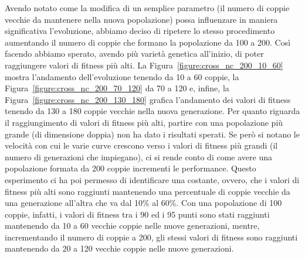 Avendo notato come la modifica di un semplice parametro (il numero di coppie
vecchie da mantenere nella nuova popolazione) possa influenzare in maniera
significativa l'evoluzione, abbiamo deciso di ripetere lo stesso procedimento
aumentando il numero di coppie che formano la popolazione da 100 a 200. Così
facendo abbiamo sperato, avendo più varietà genetica all'inizio, di poter
raggiungere valori di fitness più alti.\newline
La Figura~\ref{figure:cross_nc_200_10_60} mostra l'andamento dell'evoluzione
tenendo da 10 a 60 coppie, la Figura~\ref{figure:cross_nc_200_70_120} da 70 a
120 e, infine, la Figura~\ref{figure:cross_nc_200_130_180} grafica l'andamento
dei valori di fitness tenendo da 130 a 180 coppie vecchie nella nuova
generazione.\newline
Per quanto riguarda il raggiungimento di valori di fitness più alti, partire
con una popolazione più grande (di dimensione doppia) non ha dato i risultati
sperati. Se però si notano le velocità con cui le varie curve crescono verso i
valori di fitness più grandi (il numero di generazioni che impiegano), ci si
rende conto di come avere una popolazione formata da 200 coppie incrementi le
performance.\newline
Questo esperimento ci ha poi permesso di identificare una costante, ovvero, che
i valori di fitness più alti sono raggiunti mantenendo una percentuale
di coppie vecchie da una generazione all'altra che va dal 10\% al 60\%. Con una
popolazione di 100 coppie, infatti, i valori di fitness tra i 90 ed i 95 punti
sono stati raggiunti mantenendo da 10 a 60 vecchie coppie nelle nuove
generazioni, mentre, incrementando il numero di coppie a 200, gli stessi valori
di fitness sono raggiunti mantenendo da 20 a 120 vecchie coppie nelle nuove
generazioni.

\clearpage

